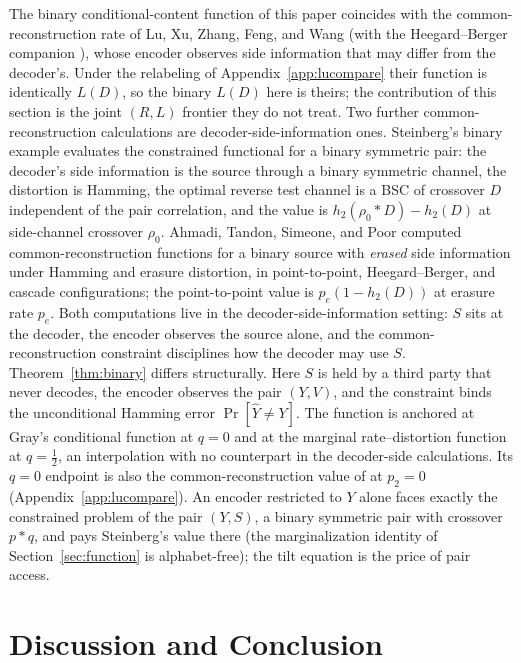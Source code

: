 ﻿\documentclass[11pt,onecolumn]{IEEEtran}
\newcommand{\hY}{\widehat{Y}}
\begin{document}
The binary conditional-content function of this paper coincides with the
common-reconstruction rate of Lu, Xu, Zhang, Feng, and Wang
\cite{lu2016lossy} (with the Heegard--Berger companion \cite{lu2016binary}),
whose encoder observes side information that may differ from the decoder's.
Under the relabeling of Appendix~\ref{app:lucompare} their function is
identically $L(D)$, so the binary $L(D)$ here is theirs; the contribution of
this section is the joint $(R,L)$ frontier they do not treat. Two further
common-reconstruction calculations are decoder-side-information ones.
Steinberg's binary example
\cite{steinberg2009} evaluates the constrained functional for a binary
symmetric pair: the decoder's side information is the source through a
binary symmetric channel, the distortion is Hamming, the optimal
reverse test channel is a BSC of crossover $D$ independent of the pair
correlation, and the value is $h_2(\rho_0*D)-h_2(D)$ at side-channel
crossover $\rho_0$. Ahmadi, Tandon, Simeone, and Poor \cite{ahmadi2013}
computed common-reconstruction functions for a binary source with
\emph{erased} side information under Hamming and erasure distortion,
in point-to-point, Heegard--Berger, and cascade configurations; the
point-to-point value is $p_e(1-h_2(D))$ at erasure rate $p_e$. Both
computations live in the decoder-side-information setting: $S$ sits at
the decoder, the encoder observes the source alone, and the
common-reconstruction constraint disciplines how the decoder may use
$S$. Theorem~\ref{thm:binary} differs structurally. Here $S$ is held
by a third party that never decodes, the encoder observes the pair
$(Y,V)$, and the constraint binds the unconditional Hamming error
$\Pr[\hY\ne Y]$. The function is anchored at Gray's conditional
function at $q=0$ and at the marginal rate--distortion function at
$q=\tfrac12$, an interpolation with no counterpart in the
decoder-side calculations. Its $q=0$ endpoint is also the
common-reconstruction value of \cite{lu2016lossy} at $p_2=0$
(Appendix~\ref{app:lucompare}). An encoder restricted to $Y$ alone faces
exactly the constrained problem of the pair $(Y,S)$, a binary
symmetric pair with crossover $p*q$, and pays Steinberg's value there
(the marginalization identity of Section~\ref{sec:function} is
alphabet-free); the tilt equation is the price of pair access.

\section{Discussion and Conclusion}
\label{sec:discussion}
\end{document}
